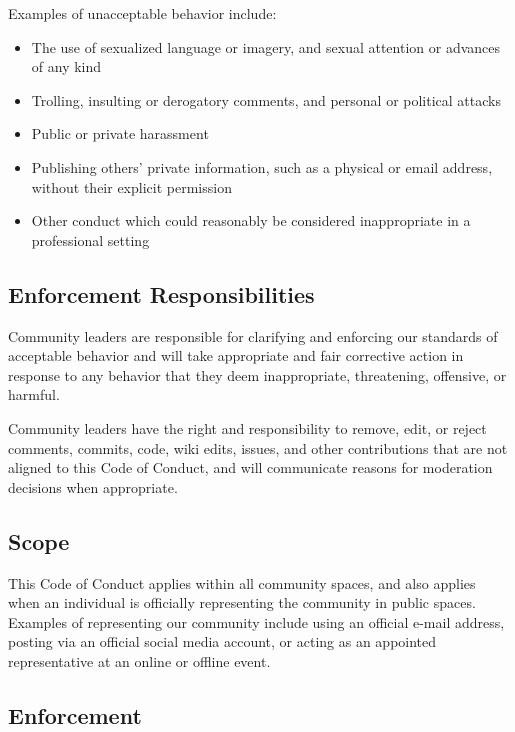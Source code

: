 \documentclass[
  fontsize=13pt,
  english,
  a4paper,
  openany, a4paper, oneside]{article}
\providecommand{\tightlist}{%
  \setlength{\itemsep}{0pt}\setlength{\parskip}{0pt}}
\begin{document}
Examples of unacceptable behavior include:

\begin{itemize}
\tightlist
\item
  The use of sexualized language or imagery, and sexual attention or
  advances of any kind
\item
  Trolling, insulting or derogatory comments, and personal or political attacks
\item
  Public or private harassment
\item
  Publishing others' private information, such as a physical or email
  address, without their explicit permission
\item
  Other conduct which could reasonably be considered inappropriate in a
  professional setting
\end{itemize}

\hypertarget{enforcement-responsibilities}{%
\subsection{Enforcement Responsibilities}\label{enforcement-responsibilities}}

Community leaders are responsible for clarifying and enforcing our standards of
acceptable behavior and will take appropriate and fair corrective action in
response to any behavior that they deem inappropriate, threatening, offensive,
or harmful.

Community leaders have the right and responsibility to remove, edit, or reject
comments, commits, code, wiki edits, issues, and other contributions that are
not aligned to this Code of Conduct, and will communicate reasons for moderation
decisions when appropriate.

\hypertarget{scope}{%
\subsection{Scope}\label{scope}}

This Code of Conduct applies within all community spaces, and also applies when
an individual is officially representing the community in public spaces.
Examples of representing our community include using an official e-mail address,
posting via an official social media account, or acting as an appointed
representative at an online or offline event.

\hypertarget{enforcement}{%
\subsection{Enforcement}\label{enforcement}}
\end{document}
